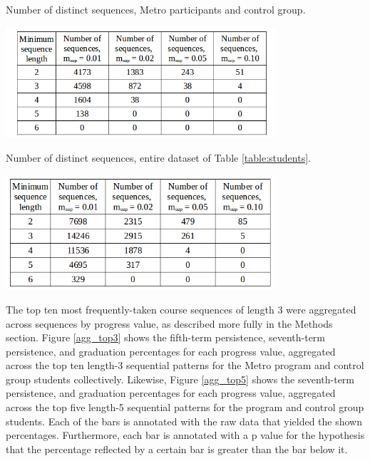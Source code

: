 \begin{table}[htbp]
\centering
\caption{Number of distinct sequences, Metro participants and control group.}
\includegraphics[width=0.75\textwidth]{tables/minsup_length_metrocomp.png}
\label{minsup_length_metrocomp}
\end{table}

\begin{table}[htbp]
\centering
\caption{Number of distinct sequences, entire dataset of Table \ref{table:students}.}
\includegraphics[width=0.75\textwidth]{tables/minsup_all.png}
\label{minsup_length_all}
\end{table}

The top ten most frequently-taken course sequences of length 3 were aggregated across sequences by progress value, as described more fully in the Methods section.  Figure \ref{agg_top3} shows the fifth-term persistence, seventh-term persistence, and graduation percentages for each progress value, aggregated across the top ten length-3 sequential patterns for the Metro program and control group students collectively.  Likewise, Figure \ref{agg_top5} shows the seventh-term persistence, and graduation percentages for each progress value, aggregated across the top five length-5 sequential patterns for the program and control group students.  Each of the bars is annotated with the raw data that yielded the shown percentages.  Furthermore, each bar is annotated with a p value for the hypothesis that the percentage reflected by a certain bar is greater than the bar below it.  

